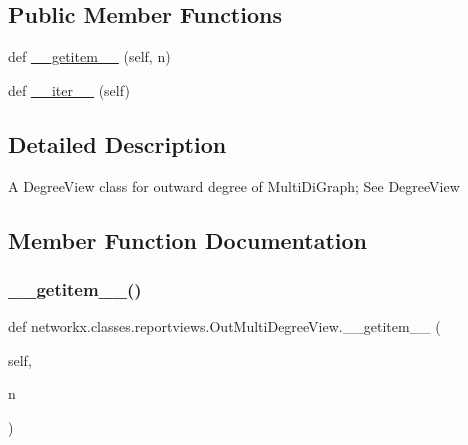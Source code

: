 \subsection*{Public Member Functions}
\begin{DoxyCompactItemize}
\item 
def \hyperlink{classnetworkx_1_1classes_1_1reportviews_1_1OutMultiDegreeView_adce28dd366511b5b6f58e8358a198631}{\+\_\+\+\_\+getitem\+\_\+\+\_\+} (self, n)
\item 
def \hyperlink{classnetworkx_1_1classes_1_1reportviews_1_1OutMultiDegreeView_a38e96d83a647d5faa4f9aca930400f78}{\+\_\+\+\_\+iter\+\_\+\+\_\+} (self)
\end{DoxyCompactItemize}


\subsection{Detailed Description}
\begin{DoxyVerb}A DegreeView class for outward degree of MultiDiGraph; See DegreeView\end{DoxyVerb}
 

\subsection{Member Function Documentation}
\mbox{\label{classnetworkx_1_1classes_1_1reportviews_1_1OutMultiDegreeView_adce28dd366511b5b6f58e8358a198631}} 
\subsubsection{\texorpdfstring{\+\_\+\+\_\+getitem\+\_\+\+\_\+()}{\_\_getitem\_\_()}}
{\footnotesize\ttfamily def networkx.\+classes.\+reportviews.\+Out\+Multi\+Degree\+View.\+\_\+\+\_\+getitem\+\_\+\+\_\+ (\begin{DoxyParamCaption}\item[{}]{self,  }\item[{}]{n }\end{DoxyParamCaption})}

